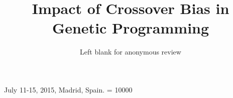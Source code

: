 \documentclass{sig-alternate}
\begin{document}
 {July 11-15, 2015, Madrid, Spain.}
\widowpenalty = 10000
    
\title{Impact of Crossover Bias in Genetic Programming}

\author{Left blank for anonymous review}




\date{} 

\maketitle
\end{document}
